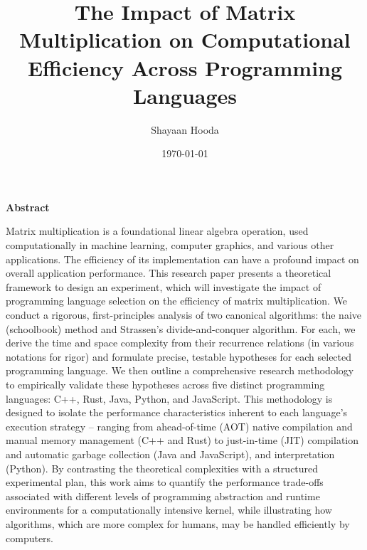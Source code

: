 \documentclass[11pt, a4paper, titlepage]{scrartcl}
\title{\vspace{-2cm}\textbf{\Huge The Impact of Matrix Multiplication on Computational Efficiency Across Programming Languages}}
\author[1]{Shayaan Hooda}
\affil[1]{Oakton High School Research Project}
\date{\today}
\begin{document}
\maketitle
\vspace{-1.5em}
\begin{center}
\textbf{Abstract}
\end{center}

\begin{tcolorbox}
Matrix multiplication is a foundational linear algebra operation, used computationally in machine learning, computer graphics, and various other applications. The efficiency of its implementation can have a profound impact on overall application performance. This research paper presents a theoretical framework to design an experiment, which will investigate the impact of programming language selection on the efficiency of matrix multiplication. We conduct a rigorous, first-principles analysis of two canonical algorithms: the naive (schoolbook) method and Strassen’s divide-and-conquer algorithm. For each, we derive the time and space complexity from their recurrence relations (in various notations for rigor) and formulate precise, testable hypotheses for each selected programming language. We then outline a comprehensive research methodology to empirically validate these hypotheses across five distinct programming languages: C++, Rust, Java, Python, and JavaScript. This methodology is designed to isolate the performance characteristics inherent to each language’s execution strategy – ranging from ahead-of-time (AOT) native compilation and manual memory management (C++ and Rust) to just-in-time (JIT) compilation and automatic garbage collection (Java and JavaScript), and interpretation (Python). By contrasting the theoretical complexities with a structured experimental plan, this work aims to quantify the performance trade-offs associated with different levels of programming abstraction and runtime environments for a computationally intensive kernel, while illustrating how algorithms, which are more complex for humans, may be handled efficiently by computers.
\end{tcolorbox}
\newpage

\vspace{1.5em}
\tableofcontents
\newpage

\end{document}
